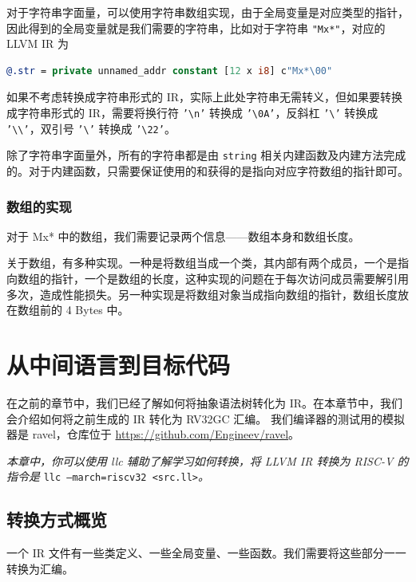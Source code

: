 对于字符串字面量，可以使用字符串数组实现，由于全局变量是对应类型的指针，因此得到的全局变量就是我们需要的字符串，比如对于字符串
\texttt{"Mx*"}，对应的 LLVM IR 为
\begin{lstlisting}[language=llvm]
@.str = private unnamed_addr constant [12 x i8] c"Mx*\00"
\end{lstlisting}

如果不考虑转换成字符串形式的 IR，实际上此处字符串无需转义，但如果要转换成字符串形式的
IR，需要将换行符 \texttt{'\textbackslash{}n'} 转换成 \texttt{'\textbackslash{}0A'}，反斜杠
\texttt{'\textbackslash'} 转换成 \texttt{'\textbackslash\textbackslash'}，双引号
\texttt{'\textbackslash'} 转换成 \texttt{'\textbackslash22'}。

除了字符串字面量外，所有的字符串都是由 \texttt{string}
相关内建函数及内建方法完成的。对于内建函数，只需要保证使用的和获得的是指向对应字符数组的指针即可。

\subsubsection{数组的实现}\label{AST-to-IR-for-builtin-array}

对于 Mx* 中的数组，我们需要记录两个信息——数组本身和数组长度。

关于数组，有多种实现。一种是将数组当成一个类，其内部有两个成员，一个是指向数组的指针，一个是数组的长度，这种实现的问题在于每次访问成员需要解引用多次，造成性能损失。另一种实现是将数组对象当成指向数组的指针，数组长度放在数组前的
4 Bytes 中。

\section{从中间语言到目标代码}

在之前的章节中，我们已经了解如何将抽象语法树转化为
IR。在本章节中，我们会介绍如何将之前生成的 IR 转化为 RV32GC 汇编。
我们编译器的测试用的模拟器是 ravel，仓库位于 \url{https://github.com/Engineev/ravel}。

\textit{本章中，你可以使用 llc 辅助了解学习如何转换，将 LLVM IR 转换为 RISC-V 的指令是}
\texttt{llc --march=riscv32 <src.ll>}\textit{。}

\subsection{转换方式概览}

一个 IR 文件有一些类定义、一些全局变量、一些函数。我们需要将这些部分一一转换为汇编。


